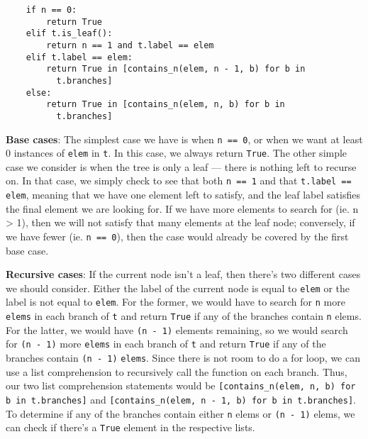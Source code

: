\begin{blocksection}
\begin{solution}
\begin{lstlisting}
    if n == 0:
        return True
    elif t.is_leaf():
        return n == 1 and t.label == elem
    elif t.label == elem:
        return True in [contains_n(elem, n - 1, b) for b in     
          t.branches]
    else:
        return True in [contains_n(elem, n, b) for b in 
          t.branches]
\end{lstlisting}
\textbf{Base cases}: The simplest case we have is when \lstinline{n == 0}, or when we want at least 0 instances of \lstinline{elem} in \lstinline{t}. In this case, we always return \lstinline{True}. The other simple case we consider is when the tree is only a leaf — there is nothing left to recurse on. In that case, we simply check to see that both \lstinline{n == 1} and that \lstinline{t.label == elem}, meaning that we have one element left to satisfy, and the leaf label satisfies the final element we are looking for. If we have more elements to search for (ie. n > 1), then we will not satisfy that many elements at the leaf node; conversely, if we have fewer (ie. \lstinline{n == 0}), then the case would already be covered by the first base case.

\textbf{Recursive cases}: If the current node isn't a leaf, then there's two different cases we should consider. Either the label of the current node is equal to \lstinline{elem} or the label is not equal to \lstinline{elem}. For the former, we would have to search for \lstinline{n} more \lstinline{elems} in each branch of \lstinline{t} and return \lstinline{True} if any of the branches contain \lstinline{n} elems. For the latter, we would have \lstinline{(n - 1)} elements remaining, so we would search for \lstinline{(n - 1)} more \lstinline{elems} in each branch of \lstinline{t} and return \lstinline{True} if any of the branches contain \lstinline{(n - 1)} \lstinline{elems}. Since there is not room to do a for loop, we can use a list comprehension to recursively call the function on each branch. Thus, our two list comprehension statements would be \lstinline{[contains_n(elem, n, b) for b in t.branches]} and \lstinline{[contains_n(elem, n - 1, b) for b in t.branches]}. To determine if any of the branches contain either \lstinline{n} elems or \lstinline{(n - 1)} elems, we can check if there's a \lstinline{True} element in the respective lists.

\end{solution}
\end{blocksection}
